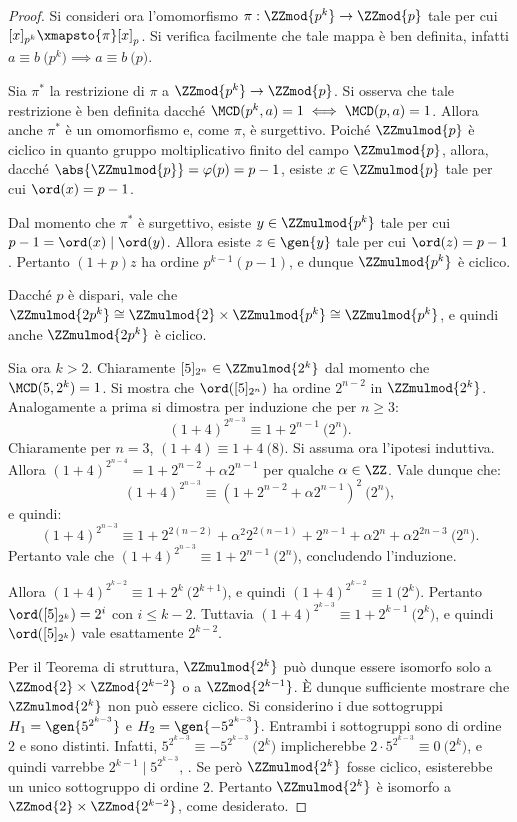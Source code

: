 \documentclass[12pt]{scrartcl}
\begin{document}
\begin{proof}
		
		Si consideri ora l'omomorfismo $\pi : \ZZmod{p^k} \to \ZZmod{p}$ tale per cui $[x]_{p^k} \xmapsto{\pi} [x]_p$.
		Si verifica facilmente che tale mappa è ben definita,
		infatti $a \equiv b \pod{p^k} \implies a \equiv b \pod{p}$. \medskip
		
		
		Sia $\pi^*$ la restrizione di $\pi$ a $\ZZmod{p^k} \to
		\ZZmod{p}$. Si osserva che tale restrizione è ben definita dacché
		$\MCD(p^k, a) = 1 \iff \MCD(p, a) = 1$. Allora anche
		$\pi^*$ è un omomorfismo e, come $\pi$, è surgettivo.
		Poiché $\ZZmulmod{p}$ è ciclico in quanto gruppo moltiplicativo finito del campo $\ZZmulmod{p}$, allora,
		dacché $\abs{\ZZmulmod{p}} = \varphi(p) = p-1$,
		esiste $x \in \ZZmulmod{p}$ tale per cui $\ord(x) = p-1$.
		\medskip
		
		
		Dal momento che $\pi^*$ è surgettivo, esiste $y \in \ZZmulmod{p^k}$ tale per cui $p-1 = \ord(x) \mid \ord(y)$.
		Allora esiste $z \in \gen{y}$ tale per cui $\ord(z) = p-1$.
		Pertanto $(1+p)z$ ha ordine $p^{k-1}(p-1)$, e dunque
		$\ZZmulmod{p^k}$ è ciclico. \medskip
		
		
		Dacché $p$ è dispari, vale che
		$\ZZmulmod{2p^k} \cong \ZZmulmod{2} \times
		\ZZmulmod{p^k} \cong \ZZmulmod{p^k}$, e quindi
		anche $\ZZmulmod{2p^k}$ è ciclico. \medskip
		
		
		Sia ora $k > 2$. Chiaramente $[5]_{2^n} \in
		\ZZmulmod{2^k}$ dal momento che $\MCD(5, 2^k) = 1$.
		Si mostra che $\ord([5]_{2^n})$ ha ordine
		$2^{n-2}$ in $\ZZmulmod{2^k}$. Analogamente a prima
		si dimostra per induzione che per $n \geq 3$:
		\[ (1 + 4)^{2^{n-3}} \equiv 1 + 2^{n-1} \pod{2^n}. \]
		Chiaramente per $n=3$, $(1 + 4) \equiv 1 + 4 \pod{8}$.
		Si assuma ora l'ipotesi induttiva. Allora
		$(1+4)^{2^{n-4}} = 1 + 2^{n-2} + \alpha 2^{n-1}$ per qualche
		$\alpha \in \ZZ$. Vale dunque che:
		\[ (1 + 4)^{2^{n-3}} \equiv (1 + 2^{n-2} + \alpha 2^{n-1})^2
		\pod{2^n}, \]
		e quindi:
		\[ (1 + 4)^{2^{n-3}} \equiv 1 + 2^{2(n-2)} + \alpha^2 2^{2(n-1)} + 2^{n-1} + \alpha 2^n + \alpha 2^{2n-3} \pod{2^n}. \]
		Pertanto vale che $(1 + 4)^{2^{n-3}} \equiv 1 + 2^{n-1} \pod{2^n}$, concludendo l'induzione. \medskip
		
		
		Allora $(1 + 4)^{2^{k-2}} \equiv 1 + 2^k \pod{2^{k+1}}$,
		e quindi $(1 + 4)^{2^{k-2}} \equiv 1 \pod{2^k}$. Pertanto
		$\ord([5]_{2^k}) = 2^i$ con $i \leq k-2$. Tuttavia
		$(1 + 4)^{2^{k-3}} \equiv 1 + 2^{k-1} \pod{2^k}$, e quindi
		$\ord([5]_{2^k})$ vale esattamente $2^{k-2}$. \medskip
		
		
		Per il Teorema di struttura, $\ZZmulmod{2^k}$ può
		dunque essere isomorfo solo a $\ZZmod{2} \times
		\ZZmod{2^{k-2}}$ o a $\ZZmod{2^{k-1}}$. È dunque
		sufficiente mostrare che $\ZZmulmod{2^k}$ non può
		essere ciclico. Si considerino i due sottogruppi
		$H_1 = \gen{5^{2^{k-3}}}$ e $H_2 = \gen{-5^{2^{k-3}}}$.
		Entrambi i sottogruppi sono di ordine $2$ e sono
		distinti. Infatti, $5^{2^{k-3}} \equiv -5^{2^{k-3}} \pod{2^k}$
		implicherebbe $2 \cdot 5^{2^{k-3}} \equiv 0 \pod{2^k}$, e
		quindi varrebbe $2^{k-1} \mid 5^{2^{k-3}}$, \Lightning.
		Se però $\ZZmulmod{2^k}$ fosse ciclico, esisterebbe un
		unico sottogruppo di ordine $2$. Pertanto
		$\ZZmulmod{2^k}$ è isomorfo a $\ZZmod{2} \times
		\ZZmod{2^{k-2}}$, come desiderato. \bigskip
		

\end{proof}
\end{document}
